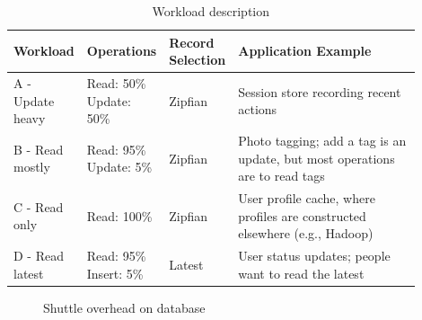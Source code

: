 \begin{table}[ht] 
\centering
\begin{tabular}{p{0.18\linewidth}p{0.15\linewidth}p{0.09\linewidth}p{0.48\linewidth}}
\textbf{Workload}       & \textbf{Operations}                   & \textbf{Record \newline Selection} & \textbf{Application Example} \\ \hline
A - Update heavy        & Read: 50\% \newline Update: 50\%               & Zipfian                & Session store recording recent actions\\ \hline
B - Read mostly         & Read: 95\% \newline Update: 5\%                & Zipfian                & Photo tagging; add a tag is an update, but most operations are to read tags\\ \hline
C - Read only           & Read: 100\%                           & Zipfian                & User profile cache, where profiles are constructed elsewhere (e.g., Hadoop)\\ \hline
D - Read latest         & Read: 95\% \newline Insert: 5\%                & Latest                 & User status updates; people want to read the latest \\ \hline

\end{tabular}
\caption{Workload description}
\label{tab:workload_description}
\end{table}


\begin{figure}[!htb]
  \centering



  \caption{Shuttle overhead on database}
  \label{fig:database_overhead_workloads}
\end{figure}

